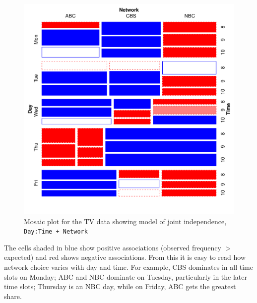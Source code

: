 \documentclass[11pt]{book}
\renewenvironment{knitrout}{\small\renewcommand{\baselinestretch}{.85}}{} %
\begin{document}
\begin{knitrout}
\color{fgcolor}\begin{kframe}
\begin{alltt}
\hlopt{$} \hlkwb{<-} \hlstd{(}\hlstd{,} \hlstd{,} \hlstd{)}     
\hlstd{(}\hlopt{~}  \hlopt{+}  \hlopt{+}   \hlstd{=}\hlopt{~}\hlopt{:} \hlopt{+} 
         \hlstd{=}\hlstd{,} 
\end{alltt}
\end{kframe}\begin{figure}[!htb]


\centerline{\includegraphics[width=.75\textwidth]{ch02/fig/TV-mosaic} }

\caption[Mosaic plot for the TV data]{Mosaic plot for the TV data showing model of joint independence, \texttt{Day:Time + Network}\label{fig:TV-mosaic}}
\end{figure}


\end{knitrout}
\noindent
The cells shaded in blue show positive associations (observed frequency $>$ expected) and red shows negative associations.  From this it is easy to read 
how network choice varies with day and
time. For example, CBS dominates in all time slots on Monday;
ABC and NBC dominate on Tuesday, particularly in the later time slots;
Thursday is an NBC day, while on Friday, ABC gets the greatest share.
\end{document}
